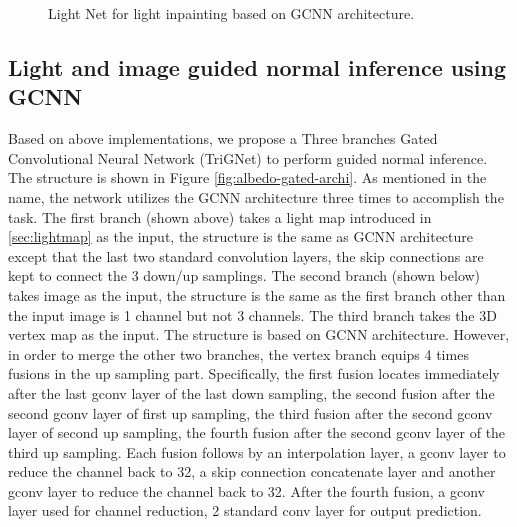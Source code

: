 \documentclass[border=15pt, multi, tikz]{article}
\begin{document}
\begin{figure}[th]
\caption{Light Net for light inpainting based on GCNN architecture.}
\label{fig:light-net-archi}
\end{figure}


\subsection{Light and image guided normal inference using GCNN}
Based on above implementations, we propose a Three branches Gated Convolutional Neural Network (TriGNet) to perform guided normal inference. The structure is shown in Figure \ref{fig:albedo-gated-archi}. As mentioned in the name, the network utilizes the GCNN architecture three times to accomplish the task. The first branch (shown above) takes a light map introduced in \ref{sec:lightmap} as the input, the structure is the same as GCNN architecture except that the last two standard convolution layers, the skip connections are kept to connect the 3 down/up samplings. 
The second branch (shown below) takes image as the input, the structure is the same as the first branch other than the input image is 1 channel but not 3 channels. 
The third branch takes the 3D vertex map as the input. The structure is based on GCNN architecture. However, in order to merge the other two branches, the vertex branch equips 4 times fusions in the up sampling part. Specifically, the first fusion locates immediately after the last gconv layer of the last down sampling, the second fusion after the second gconv layer of first up sampling, the third fusion after the second gconv layer of second up sampling, the fourth fusion after the second gconv layer of the third up sampling. Each fusion follows by an interpolation layer, a gconv layer to reduce the channel back to 32, a skip connection concatenate layer and another gconv layer to reduce the channel back to 32. After the fourth fusion, a gconv layer used for channel reduction, 2 standard conv layer for output prediction.
\end{document}
